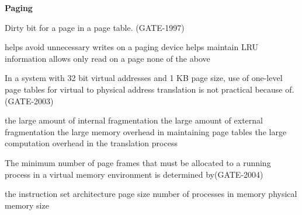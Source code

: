 
\centerline{\textbf{ \LARGE Paging}}

\setcounter{question}{0}



\begin{questyle}

  \question Dirty bit for a page in a page table. (GATE-1997)

  \begin{choices}
    \choice helps avoid unnecessary writes on a paging device
    \choice helps maintain LRU information
    \choice allows only read on a page
    \choice none of the above
  \end{choices}
\end{questyle}



\begin{questyle}

  \question In a system with 32 bit virtual addresses and 1 KB page size, use of one-level page tables for virtual to
            physical address translation is not practical because of. (GATE-2003)

  \begin{choices}
    \choice the large amount of internal fragmentation
    \choice the large amount of external fragmentation
    \choice the large memory overhead in maintaining page tables
    \choice  the large computation overhead in the translation process
  \end{choices}

\end{questyle}


\begin{questyle}

  \question  The minimum number of page frames that must be allocated to a running process in a virtual memory
            environment is determined by(GATE-2004)

  \begin{choices}
    \choice the instruction set architecture
    \choice page size
    \choice number of processes in memory
    \choice physical memory size
  \end{choices}

\end{questyle}

